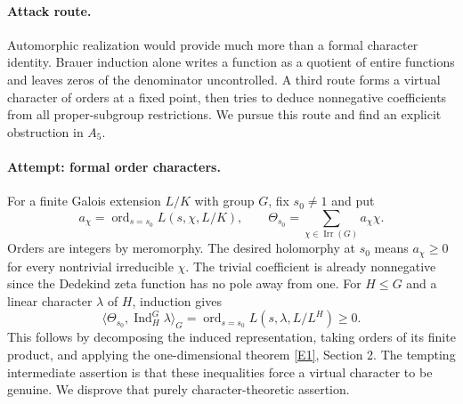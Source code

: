 \documentclass[11pt,a4paper]{article}
\newcommand{\eref}[2]{\hyperlink{extra:#1:#2}{[E#2]}}
\numberwithin{equation}{section}
\begin{document}
\paragraph{Attack route.}
Automorphic realization would provide much more than a formal character identity. Brauer induction alone writes a function as a quotient of entire functions and leaves zeros of the denominator uncontrolled. A third route forms a virtual character of orders at a fixed point, then tries to deduce nonnegative coefficients from all proper-subgroup restrictions. We pursue this route and find an explicit obstruction in $A_5$.

\paragraph{Attempt: formal order characters.}
For a finite Galois extension $L/K$ with group $G$, fix $s_0\ne1$ and put
\[
 a_\chi=\operatorname{ord}_{s=s_0}L(s,\chi,L/K),\qquad
 \Theta_{s_0}=\sum_{\chi\in\operatorname{Irr}(G)}a_\chi\chi.
\]
Orders are integers by meromorphy. The desired holomorphy at $s_0$ means $a_\chi\ge0$ for every nontrivial irreducible $\chi$. The trivial coefficient is already nonnegative since the Dedekind zeta function has no pole away from one. For $H\le G$ and a linear character $\lambda$ of $H$, induction gives
\begin{equation}\label{r66:tests}
 \langle\Theta_{s_0},\operatorname{Ind}_H^G\lambda\rangle_G
 =\operatorname{ord}_{s=s_0}L(s,\lambda,L/L^H)\ge0.
\end{equation}
This follows by decomposing the induced representation, taking orders of its finite product, and applying the one-dimensional theorem \eref{30006705}{1}, Section 2. The tempting intermediate assertion is that these inequalities force a virtual character to be genuine. We disprove that purely character-theoretic assertion.
\end{document}
